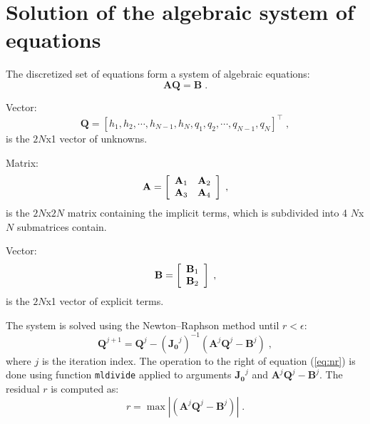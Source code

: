 \documentclass{deltares_report_elv}
\begin{document}
\section{Solution of the algebraic system of equations}

The discretized set of equations form a system of algebraic equations:
\begin{equation}
\label{eq:alg}
\mathbf{A}\mathbf{Q}=\mathbf{B}\;.
\end{equation}

Vector:
\begin{equation}
\mathbf{Q}=[h_1, h_2, \cdots, h_{N-1}, h_N, q_1, q_2, \cdots, q_{N-1}, q_N]^{\intercal} \;,
\end{equation}
is the $2N$x1 vector of unknowns. 

Matrix:
\begin{equation}
\makebox[\textwidth][c]{$
		\mathbf{A}=\left[
		\begin{array}{cc}
  \mathbf{A}_{1} & \mathbf{A}_{2} \\
	\mathbf{A}_{3} & \mathbf{A}_{4} \\
 \end{array}\right] \;,
$} 
\end{equation}
is the $2N$x$2N$ matrix containing the implicit terms, which is subdivided into 4 $N$x$N$ submatrices contain.

Vector:
\begin{equation}
\makebox[\textwidth][c]{$
		\mathbf{B}=\left[
		\begin{array}{cc}
  \mathbf{B}_{1}\\
	\mathbf{B}_{2}\\
 \end{array}\right] \;,
$} 
\end{equation}
is the $2N$x1 vector of explicit terms. 

The system is solved using the Newton–Raphson method until $r<\epsilon$:
\begin{equation}
\label{eq:nr}
\mathbf{Q}^{j+1}=\mathbf{Q}^{j}-(\mathbf{J_0}^{j})^{-1}\left(\mathbf{A}^{j}\mathbf{Q}^{j}-\mathbf{B}^{j}\right) \;,
\end{equation}
where $j$ is the iteration index. The operation to the right of equation (\ref{eq:nr}) is done using function \texttt{mldivide} applied to arguments $\mathbf{J_0}^{j}$ and $\mathbf{A}^{j}\mathbf{Q}^{j}-\mathbf{B}^{j}$. The residual $r$ is computed as:
\begin{equation}
r=\max{\left|\left(\mathbf{A}^{j}\mathbf{Q}^{j}-\mathbf{B}^{j}\right)\right|} \;.
\end{equation}
\end{document}
